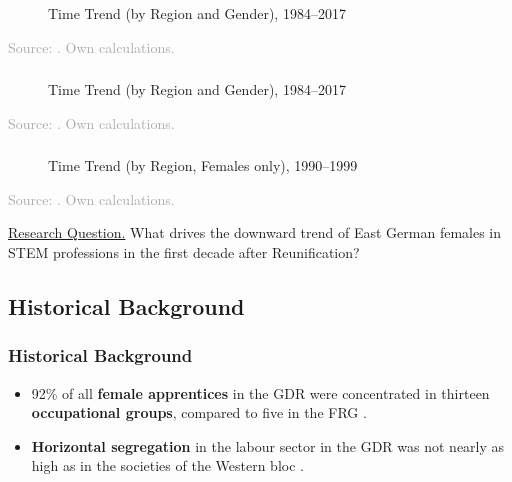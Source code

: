 \documentclass[11pt, aspectratio=1610, xcolor={dvipsnames}]{beamer}
\newcommand{\highlight}[1]{\textbf{\textcolor{PineGreen}{#1}}}
\begin{document}
	\begin{frame}
		\frametitle{}
		
		\begin{figure}[h]
			\centering
			\caption{Time Trend (by Region and Gender), 1984--2017}
			\label{fig:trend}
			\resizebox{75mm}{!}{}
		\end{figure}
		
		{\scriptsize
			\textcolor{darkgray}{Source: \cite{SOEP2023}. Own calculations.}
		}
		
	\end{frame}
	
	\begin{frame}
		\frametitle{}
		
		\begin{figure}[h]
			\centering
			\caption{Time Trend (by Region and Gender), 1984--2017}
			\label{fig:trend_highlight}
			\resizebox{75mm}{!}{}
		\end{figure}
		
		{\scriptsize
			\textcolor{darkgray}{Source: \cite{SOEP2023}. Own calculations.}
		}
		
	\end{frame}
	
	\begin{frame}
		\frametitle{}
		
		\begin{figure}[h]
			\centering
			\caption{Time Trend (by Region, Females only), 1990--1999}
			\label{fig:trend_zoomed}
			\resizebox{75mm}{!}{}
		\end{figure}
		
		{\scriptsize
			\textcolor{darkgray}{Source: \cite{SOEP2023}. Own calculations.}
		}
		
	\end{frame}
	
	\begin{frame}
		
		\textcolor{PineGreen}{\underline{Research Question.}} What drives the downward trend of East German females in STEM professions in the first decade after Reunification?
		
	\end{frame}
	
	\subsection{Historical Background}
	\begin{frame}
		\frametitle{Historical Background}
		
		\begin{itemize}
			\item 92\% of all \highlight{female apprentices} in the GDR were concentrated in thirteen \highlight{occupational groups}, compared to five in the FRG \textcolor{darkgray}{\citep{Menschik1974}}.
			\item \highlight{Horizontal segregation} in the labour sector in the GDR was not nearly as high as in the societies of the Western bloc \textcolor{darkgray}{\citep{Lane1983}}.
		\end{itemize}
		
	\end{frame}
	
\end{document}
